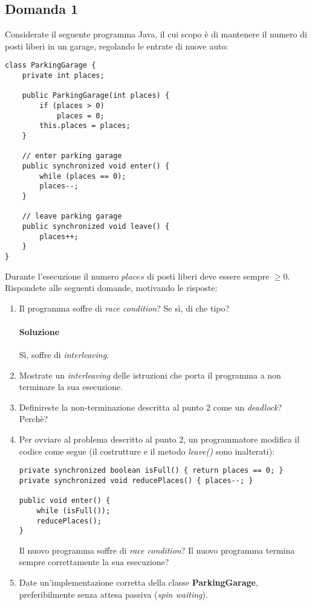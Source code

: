 \subsection{Domanda 1}
Considerate il seguente programma Java, il cui scopo è di mantenere il numero di posti liberi in un garage, regolando le entrate di nuove auto:
\begin{lstlisting}
class ParkingGarage {
	private int places;

	public ParkingGarage(int places) {
		if (places > 0)
			places = 0;
		this.places = places;
	}

	// enter parking garage
	public synchronized void enter() {
		while (places == 0);
		places--;
	}

	// leave parking garage
	public synchronized void leave() {
		places++;
	}
}
\end{lstlisting}
Durante l'esecuzione il numero $places$ di posti liberi deve essere sempre $\geq 0$. Rispondete alle seguenti domande, motivando le risposte:
\begin{enumerate}
	\item Il programma soffre di \textit{race condition}? Se s\`{i}, di che tipo?
	\paragraph{Soluzione}
	S\`{i}, soffre di \textit{interleaving}.
	\item Mostrate un \textit{interleaving} delle istruzioni che porta il programma a non terminare la sua esecuzione.
	\item Definireste la non-terminazione descritta al punto 2 come un \textit{deadlock}? Perch\`{e}?
	\item Per ovviare al problema descritto al punto 2, un programmatore modifica il codice come segue (il costrutture e il metodo \textit{leave()} sono inalterati):
	\begin{lstlisting}
private synchronized boolean isFull() { return places == 0; }
private synchronized void reducePlaces() { places--; }

public void enter() {
	while (isFull());
	reducePlaces();
}
	\end{lstlisting}
	Il nuovo programma soffre di \textit{race condition}? Il nuovo programma termina sempre correttamente la sua esecuzione?
	\item Date un'implementazione corretta della classe \textbf{ParkingGarage}, preferibilmente senza attesa passiva (\textit{spin waiting}).
\end{enumerate}

